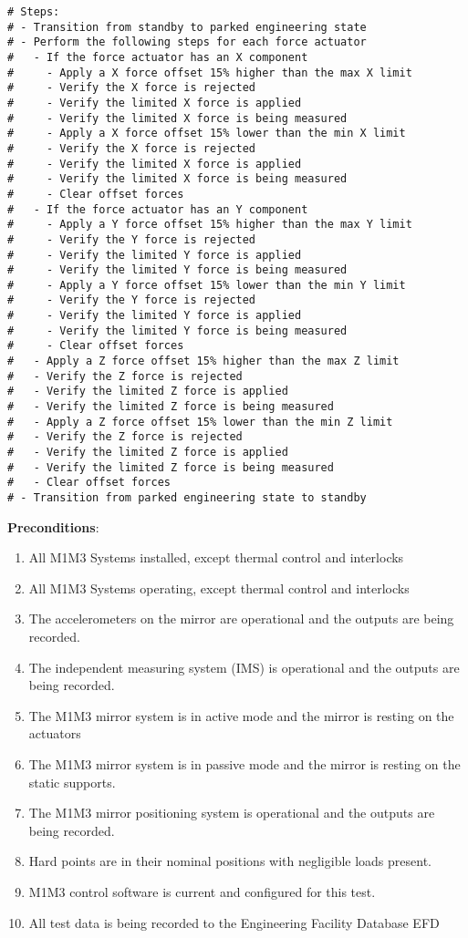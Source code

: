 \documentclass[SE,lsstdraft,STR,toc]{lsstdoc}
\providecommand{\tightlist}{
  \setlength{\itemsep}{0pt}\setlength{\parskip}{0pt}}
\begin{document}
\begin{verbatim}
# Steps:
# - Transition from standby to parked engineering state
# - Perform the following steps for each force actuator
#   - If the force actuator has an X component
#     - Apply a X force offset 15% higher than the max X limit
#     - Verify the X force is rejected
#     - Verify the limited X force is applied
#     - Verify the limited X force is being measured
#     - Apply a X force offset 15% lower than the min X limit
#     - Verify the X force is rejected
#     - Verify the limited X force is applied
#     - Verify the limited X force is being measured
#     - Clear offset forces
#   - If the force actuator has an Y component
#     - Apply a Y force offset 15% higher than the max Y limit
#     - Verify the Y force is rejected
#     - Verify the limited Y force is applied
#     - Verify the limited Y force is being measured
#     - Apply a Y force offset 15% lower than the min Y limit
#     - Verify the Y force is rejected
#     - Verify the limited Y force is applied
#     - Verify the limited Y force is being measured
#     - Clear offset forces
#   - Apply a Z force offset 15% higher than the max Z limit
#   - Verify the Z force is rejected
#   - Verify the limited Z force is applied
#   - Verify the limited Z force is being measured
#   - Apply a Z force offset 15% lower than the min Z limit
#   - Verify the Z force is rejected
#   - Verify the limited Z force is applied
#   - Verify the limited Z force is being measured
#   - Clear offset forces
# - Transition from parked engineering state to standby
\end{verbatim}

\textbf{ Preconditions}:\\
\begin{enumerate}
\tightlist
\item
  All M1M3 Systems installed, except thermal control and interlocks
\item
  All M1M3 Systems operating, except thermal control and interlocks
\item
  The accelerometers on the mirror are operational and the outputs are
  being recorded.
\item
  The independent measuring system (IMS) is operational and the outputs
  are being recorded.
\item
  The M1M3 mirror system is in active mode and the mirror is resting on
  the actuators
\item
  The M1M3 mirror system is in passive mode and the mirror is resting on
  the static supports.
\item
  The M1M3 mirror positioning system is operational and the outputs are
  being recorded.
\item
  Hard points are in their nominal positions with negligible loads
  present.
\item
  M1M3 control software is current and configured for this test.
\item
  All test data is being recorded to the Engineering Facility Database
  EFD
\end{enumerate}
\end{document}
